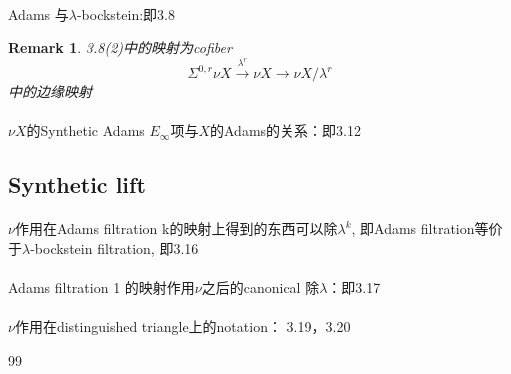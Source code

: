 \documentclass[12pt,a4paper]{article}
\newtheorem{rem}[equation]{Remark}
\begin{document}
\begin{sloppy}
\paragraph{} Adams 与$\lambda$-bockstein:即3.8
\begin{rem}
    3.8(2)中的映射为cofiber
    $$\Sigma^{0,r}\nu X\xrightarrow{\lambda^r} \nu X \xrightarrow{} \nu X/\lambda^r$$
    中的边缘映射
\end{rem}

\paragraph{}$\nu X$的Synthetic Adams $E_\infty$项与$X$的Adams的关系：即3.12

\subsection{Synthetic lift}

\paragraph{}$\nu$作用在Adams filtration k的映射上得到的东西可以除$\lambda^k$, 即Adams filtration等价于$\lambda$-bockstein filtration, 即3.16

\paragraph{} Adams filtration 1 的映射作用$\nu$之后的canonical 除$\lambda$：即3.17

\paragraph{} $\nu$作用在distinguished triangle上的notation： 3.19，3.20


\begin{thebibliography}{99}


\end{thebibliography}

\end{sloppy}
\end{document}
